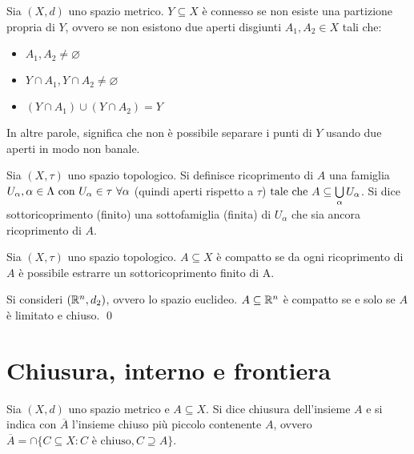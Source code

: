 \begin{definition}
    Sia $(X,d)$ uno spazio metrico. $Y \subseteq X$ è connesso se non esiste una partizione propria di $Y$, ovvero se non esistono due aperti disgiunti $A_1, A_2 \in X$ tali che:
    \begin{itemize}
        \item $A_1, A_2 \neq \varnothing$
        \item $Y \cap A_1, Y \cap A_2 \neq \varnothing$
        \item $(Y\cap A_1)\cup(Y \cap A_2)=Y$
    \end{itemize}
    In altre parole, significa che non è possibile separare i punti di $Y$ usando due aperti in modo non banale.
\end{definition}

\begin{definition}
    [Ricoprimento]
    Sia $(X, \tau)$ uno spazio topologico. Si definisce ricoprimento di $A$ una famiglia $U_\alpha, \alpha \in \Lambda \text{ con } U_\alpha \in \tau \ \forall \alpha$ (quindi aperti rispetto a $\tau$)$\text{ tale che } A \subseteq \bigcup\limits_\alpha U_\alpha$. Si dice sottoricoprimento (finito) una sottofamiglia (finita) di $U_\alpha$ che sia ancora ricoprimento di $A$.
\end{definition}

\begin{definition}
    Sia $(X, \tau)$ uno spazio topologico. $A \subseteq X$ è compatto se da ogni ricoprimento di $A$ è possibile estrarre un sottoricoprimento finito di A.
\end{definition}

\begin{theorem}
    Si consideri $(\mathbb{R}^n, d_2)$, ovvero lo spazio euclideo. $A \subseteq \mathbb{R}^n$ è compatto se e solo se $A$ è limitato e chiuso. \qed
\end{theorem}

\section{Chiusura, interno e frontiera}

\begin{definition}
    Sia $(X, d)$ uno spazio metrico e $A \subseteq X$. Si dice chiusura dell'insieme $A$ e si indica con $\overline{A}$ l'insieme chiuso più piccolo contenente $A$, ovvero $\overline{A} = \cap\{C\subseteq X : C \text{ è chiuso}, C \supseteq A\}$.
\end{definition}

